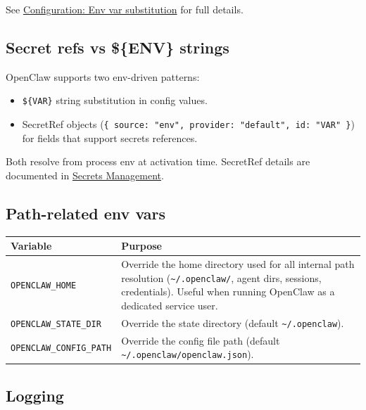 See \href{/gateway/configuration\#env-var-substitution-in-config}{Configuration: Env var substitution} for full details.

\subsection{Secret refs vs \$\{ENV\} strings}


OpenClaw supports two env-driven patterns:

\begin{itemize}
  \item \texttt{\$\{VAR\}} string substitution in config values.
  \item SecretRef objects (\texttt{\{ source: "env", provider: "default", id: "VAR" \}}) for fields that support secrets references.
\end{itemize}


Both resolve from process env at activation time. SecretRef details are documented in \href{/gateway/secrets}{Secrets Management}.

\subsection{Path-related env vars}



\begin{table}[h]
\centering
\small
\begin{tabular}{|l|l|}
\hline
Variable & Purpose \\
\hline
\texttt{OPENCLAW\_HOME} & Override the home directory used for all internal path resolution (\texttt{\textasciitilde{}/.openclaw/}, agent dirs, sessions, credentials). Useful when running OpenClaw as a dedicated service user. \\
\hline
\texttt{OPENCLAW\_STATE\_DIR} & Override the state directory (default \texttt{\textasciitilde{}/.openclaw}). \\
\hline
\texttt{OPENCLAW\_CONFIG\_PATH} & Override the config file path (default \texttt{\textasciitilde{}/.openclaw/openclaw.json}). \\
\hline
\end{tabular}
\end{table}



\subsection{Logging}



